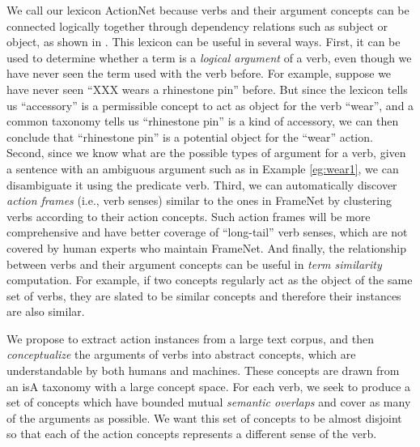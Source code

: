 We call our lexicon ActionNet because verbs and their argument
concepts can be connected logically together through dependency
relations such as subject or object, as shown in .
This lexicon can be useful in several ways.
First, it can be used to determine whether a term is
a {\em logical argument} of a verb, even though we have never
seen the term used with the verb before.
For example, suppose we have never seen ``XXX wears
a rhinestone pin'' before. But since the lexicon tells us
``accessory'' is a permissible concept to act as object for the verb ``wear'',
and a common taxonomy tells us ``rhinestone pin''
is a kind of accessory, we can then conclude that
``rhinestone pin'' is a potential object for the ``wear'' action.
Second, since we know what are the possible types of
argument for a verb, given a sentence with an ambiguous argument
such as in Example \ref{eg:wear1},
we can disambiguate it using the predicate verb.
Third, we can automatically discover {\em action frames}
(i.e., verb senses) similar to the ones in FrameNet by
clustering verbs according to their action concepts.
Such action frames will be more
comprehensive and have
better coverage of ``long-tail'' verb senses, which are
not covered by human experts who maintain FrameNet.
And finally, the relationship between verbs and their
argument concepts can be
useful in {\em term similarity} computation.
For example, if two concepts regularly act as the
object of the same set of verbs, they are slated to
be similar concepts and therefore their instances are
also similar.

We propose to extract action instances from a large text corpus,
and then {\em conceptualize} the arguments of verbs into
abstract concepts, which are understandable by both humans and
machines. These concepts are drawn from an isA taxonomy with
a large concept space.%
For each verb,
we seek to produce a set of concepts which have bounded
mutual {\em semantic overlaps} and cover as many of the
arguments as possible.
We want this set of concepts to be almost disjoint so
that each of the action concepts represents a different sense
of the verb.

